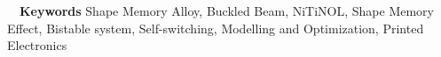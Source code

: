 
\noindent ~~\textbf{Keywords \textendash}
Shape Memory Alloy, Buckled Beam, NiTiNOL, Shape Memory Effect, Bistable system, Self-switching, Modelling and Optimization, Printed Electronics
